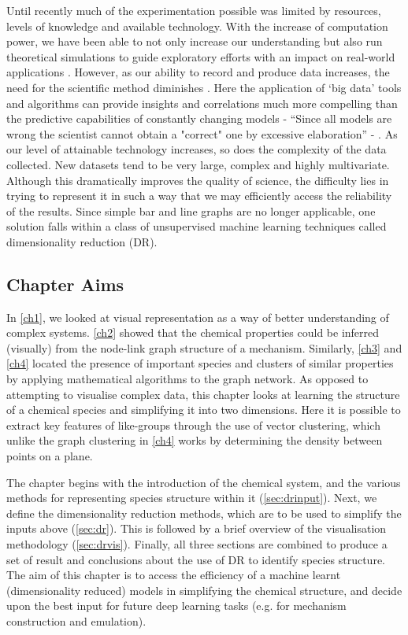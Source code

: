 Until recently much of the experimentation possible was limited by resources, levels of knowledge and available technology. With the increase of computation power, we have been able to not only increase our understanding but also run theoretical simulations to guide exploratory efforts with an impact on real-world applications \citep{dft,lion,theoreticalbio,drug}. However, as our ability to record and produce data increases, the need for the scientific method diminishes \citep{wired}. Here the application of `big data' tools and algorithms can provide insights and correlations much more compelling than the predictive capabilities of constantly changing models - ``Since all models are wrong the scientist cannot obtain
a "correct" one by excessive elaboration'' - \cite{allmodels}. As our level of attainable technology increases, so does the complexity of the data collected. New datasets tend to be very large, complex and highly multivariate. Although this dramatically improves the quality of science, the difficulty lies in trying to represent it in such a way that we may efficiently access the reliability of the results. Since simple bar and line graphs are no longer applicable, one solution falls within a class of unsupervised machine learning techniques called dimensionality reduction (DR).


\subsection{Chapter Aims}
In \autoref{ch1}, we looked at visual representation as a way of better understanding of complex systems. \autoref{ch2} showed that the chemical properties could be inferred (visually) from the node-link graph structure of a mechanism. Similarly, \autoref{ch3} and \autoref{ch4} located the presence of important species and clusters of similar properties by applying mathematical algorithms to the graph network. As opposed to attempting to visualise complex data, this chapter looks at learning the structure of a chemical species and simplifying it into two dimensions. Here it is possible to extract key features of like-groups through the use of vector clustering, which unlike the graph clustering in \autoref{ch4} works by determining the density between points on a plane.

The chapter begins with the introduction of the chemical system, and the various methods for representing species structure within it (\autoref{sec:drinput}). Next, we define the dimensionality reduction methods, which are to be used to simplify the inputs above (\autoref{sec:dr}). This is followed by a brief overview of the visualisation methodology (\autoref{sec:drvis}). Finally, all three sections are combined to produce a set of result and conclusions about the use of DR to identify species structure. The aim of this chapter is to access the efficiency of a machine learnt (dimensionality reduced) models in simplifying the chemical structure, and decide upon the best input for future deep learning tasks (e.g. for mechanism construction and emulation).



